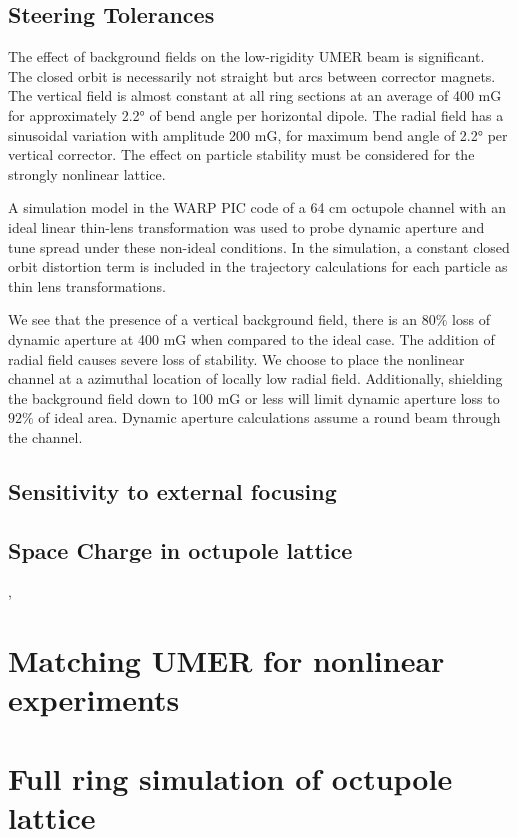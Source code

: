 

\subsection{Steering Tolerances}

The effect of background fields on the low-rigidity UMER beam is significant. The closed orbit is necessarily not straight but arcs between corrector magnets. The vertical field is almost constant at all ring sections at an average of 400 mG for approximately 2.2° of bend angle per horizontal dipole. The radial field has a sinusoidal variation with amplitude 200 mG, for maximum bend angle of 2.2° per vertical corrector. The effect on particle stability must be considered for the strongly nonlinear lattice. 

A simulation model in the WARP PIC code of a 64 cm octupole channel with an ideal linear thin-lens transformation was used to probe dynamic aperture and tune spread under these non-ideal conditions. In the simulation, a constant closed orbit distortion term is included in the trajectory calculations for each particle as thin lens transformations.

We see that the presence of a vertical background field, there is an $80\%$ loss of dynamic aperture at 400 mG when compared to the ideal case. The addition of radial field causes severe loss of stability. We choose to place the nonlinear channel at a azimuthal location of locally low radial field. Additionally, shielding the background field down to 100 mG or less will limit dynamic aperture loss to $92\%$ of ideal area. Dynamic aperture calculations assume a round beam through the channel.




\subsection{Sensitivity to external focusing}

\subsection{Space Charge in octupole lattice}

\cite{Webb2013}, \cite{WebbIPAC2013} %

\section{Matching UMER for nonlinear experiments}


\section{Full ring simulation of octupole lattice}

